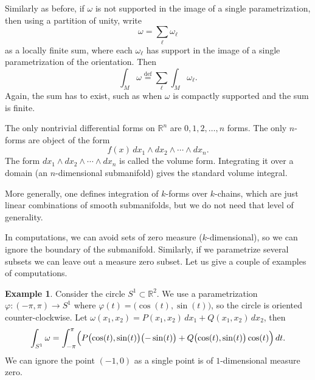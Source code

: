 \documentclass[12pt,openany]{book}
\newcommand{\R}{{\mathbb{R}}}
\theoremstyle{plain}
\theoremstyle{remark}
\theoremstyle{definition}
\theoremstyle{exercise}
\theoremstyle{example}
\newtheorem{example}[thm]{Example}
\begin{document}
Similarly as before, if $\omega$ is not supported in the
image of a single parametrization, then using a partition of unity,
write
\begin{equation*}
\omega = \sum_{\ell} \omega_\ell
\end{equation*}
as a locally finite sum,
where each $\omega_\ell$ has support in the image of a single
parametrization of the orientation.
Then
\begin{equation*}
\int_M \omega
\overset{\text{def}}{=}
\sum_{\ell}
\int_M \omega_\ell .
\end{equation*}
Again, the sum has to exist, such as when $\omega$ is compactly supported
and the sum is finite.

The only nontrivial differential forms on $\R^n$
are $0,1,2,\ldots,n$ forms.  The only $n$-forms are
object of the form
\begin{equation*}
f(x) \,
dx_1 \wedge dx_2 \wedge \cdots \wedge dx_n .
\end{equation*}
The form $dx_1 \wedge dx_2 \wedge \cdots \wedge dx_n$ is called the
volume form.  Integrating it over a domain (an $n$-dimensional submanifold)
gives the standard volume integral.

More generally, one defines integration of $k$-forms over $k$-chains,
which are just linear combinations of smooth submanifolds, but we do not
need that level of generality.

\medskip

In computations, we can avoid sets of zero measure ($k$-dimensional),
so we can ignore the boundary of the submanifold.  Similarly, if we parametrize
several subsets we can leave out a measure zero subset.
Let us give a couple of examples of computations.

\begin{example} \label{example:diffformscircleint}
Consider the circle $S^1 \subset
\R^2$.  We use a parametrization $\varphi \colon (-\pi,\pi) \to S^1$
where $\varphi(t) = \bigl(\cos(t),\sin(t)\bigr)$, so the circle is oriented
counter-clockwise.
Let $\omega(x_1,x_2) = P(x_1,x_2) \, dx_1 + Q(x_1,x_2) \, dx_2$, then
\begin{equation*}
\int_{S^1} \omega =
\int_{-\pi}^{\pi}
\Bigl(
P\bigl(\cos(t),\sin(t)\bigr) \bigl(-\sin(t)\bigr)  +
Q\bigl(\cos(t),\sin(t)\bigr) \cos(t) \Bigr) \, dt .
\end{equation*}
We can ignore the point $(-1,0)$ as a single point is of $1$-dimensional
measure zero.
\end{example}
\end{document}
